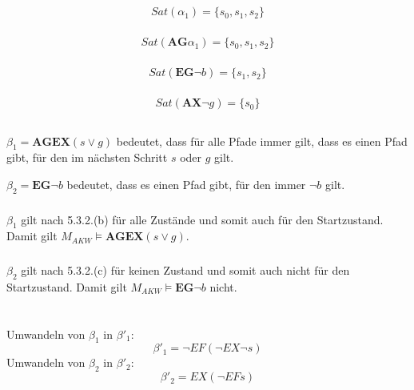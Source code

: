\documentclass[10pt,a4paper,oneside,ngerman,numbers=noenddot]{scrartcl}
\begin{document}
	\subsection{}
		\subsubsection{}
		\[Sat(\alpha _{1}) = \{s_{0},s_{1},s_{2}\}\]
		\subsubsection{}
		\[Sat(\textbf{AG}\alpha _{1}) = \{s_{0},s_{1},s_{2}\}\]
		\subsubsection{}
		\[Sat(\textbf{EG}\lnot b) = \{s_{1},s_{2}\} \]
		\subsubsection{}
		\[Sat(\textbf{AX}\lnot g) = \{s_{0}\} \]
	\subsection{}
	\(\beta _{1} = \textbf{AGEX}(s \vee g)\) bedeutet, dass für alle Pfade immer gilt, dass es einen Pfad gibt, für den im nächsten Schritt \(s\) oder \(g\) gilt.
	
	\(\beta _{2} = \textbf{EG}\lnot b\) bedeutet, dass es einen Pfad gibt, für den immer \(\lnot b\) gilt.
		
		\subsubsection{}
		\(\beta _{1}\) gilt nach 5.3.2.(b) für alle Zustände und somit auch für den Startzustand. Damit gilt \(M_{AKW} \models \textbf{AGEX}(s \vee g)\).
		\subsubsection{}
		\(\beta _{2}\) gilt nach 5.3.2.(c) für keinen Zustand und somit auch nicht für den Startzustand. Damit gilt \(M_{AKW} \models \textbf{EG}\lnot b\) nicht.
\section{} %
	\subsection{}
	Umwandeln von \(\beta _{1}\) in \(\beta '_{1}\):
	\[\beta '_{1} = \lnot EF(\lnot EX \lnot s)\]
	Umwandeln von \(\beta _{2}\) in \(\beta '_{2}\):
	\[\beta '_{2} = EX(\lnot EF s)\]
	
\end{document}
